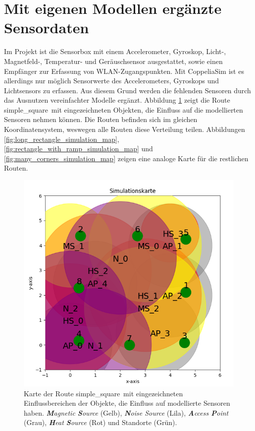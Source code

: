 \section{Mit eigenen Modellen ergänzte Sensordaten}
Im Projekt ist die Sensorbox mit einem Accelerometer, Gyroskop, Licht-, Magnetfeld-,
Temperatur- und Geräuschsensor ausgestattet, sowie einen Empfänger zur Erfassung von WLAN-Zugangspunkten.
Mit CoppeliaSim ist es allerdings nur möglich Sensorwerte des Accelerometers, Gyroskops und Lichtsensors zu erfassen.
Aus diesem Grund werden die fehlenden Sensoren durch das Ausnutzen vereinfachter Modelle ergänzt.
\newline
\newline
Abbildung \ref{fig:simple_square_simulation_map} zeigt die Route \glqq simple\_square\grqq\ mit eingezeichneten Objekten,
die Einfluss auf die modellierten Sensoren nehmen können.
Die Routen befinden sich im gleichen Koordinatensystem, weswegen alle Routen diese Verteilung teilen.
Abbildungen \ref{fig:long_rectangle_simulation_map}, \ref{fig:rectangle_with_ramp_simulation_map} und \ref{fig:many_corners_simulation_map}
zeigen eine analoge Karte für die restlichen Routen.
\begin{figure}[h!]
    \centering
    \includegraphics[width=0.7\linewidth]{images/simple_square_simulation_map.png}
    \caption{Karte der Route \glqq simple\_square\grqq\ mit eingezeichneten Einflussbereichen der Objekte, die Einfluss auf modellierte Sensoren haben.
            \textit{\textbf{M}agnetic \textbf{S}ource} (Gelb), \textit{\textbf{N}oise Source} (Lila), \textit{\textbf{A}ccess \textbf{P}oint} (Grau),
            \textit{\textbf{H}eat \textbf{S}ource} (Rot) und Standorte (Grün).}
    \label{fig:simple_square_simulation_map}
\end{figure}

